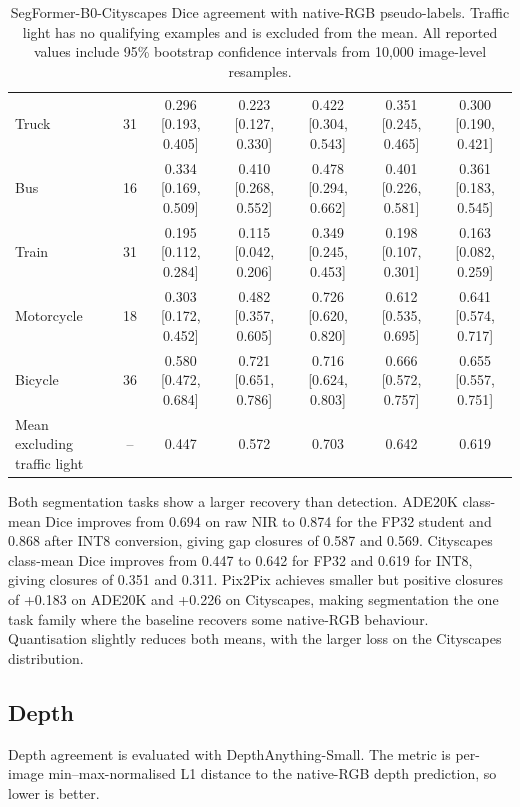 \begin{table}[!htbp]
{\begin{tabular}{lcccccc}
Truck & 31 & 0.296 [0.193, 0.405] & 0.223 [0.127, 0.330] & 0.422 [0.304, 0.543] & 0.351 [0.245, 0.465] & 0.300 [0.190, 0.421] \\
Bus & 16 & 0.334 [0.169, 0.509] & 0.410 [0.268, 0.552] & 0.478 [0.294, 0.662] & 0.401 [0.226, 0.581] & 0.361 [0.183, 0.545] \\
Train & 31 & 0.195 [0.112, 0.284] & 0.115 [0.042, 0.206] & 0.349 [0.245, 0.453] & 0.198 [0.107, 0.301] & 0.163 [0.082, 0.259] \\
Motorcycle & 18 & 0.303 [0.172, 0.452] & 0.482 [0.357, 0.605] & 0.726 [0.620, 0.820] & 0.612 [0.535, 0.695] & 0.641 [0.574, 0.717] \\
Bicycle & 36 & 0.580 [0.472, 0.684] & 0.721 [0.651, 0.786] & 0.716 [0.624, 0.803] & 0.666 [0.572, 0.757] & 0.655 [0.557, 0.751] \\
\hline
Mean excluding traffic light & -- & 0.447 & 0.572 & 0.703 & 0.642 & 0.619 \\
\hline
\end{tabular}
}
\caption{SegFormer-B0-Cityscapes Dice agreement with native-RGB pseudo-labels. Traffic light has no qualifying examples and is excluded from the mean. All reported values include 95\% bootstrap confidence intervals from 10{,}000 image-level resamples.}
\label{tab:res_seg_cityscapes}
\end{table}

Both segmentation tasks show a larger recovery than detection. ADE20K class-mean Dice improves from 0.694 on raw NIR to 0.874 for the FP32 student and 0.868 after INT8 conversion, giving gap closures of 0.587 and 0.569. Cityscapes class-mean Dice improves from 0.447 to 0.642 for FP32 and 0.619 for INT8, giving closures of 0.351 and 0.311. Pix2Pix achieves smaller but positive closures of +0.183 on ADE20K and +0.226 on Cityscapes, making segmentation the one task family where the baseline recovers some native-RGB behaviour. Quantisation slightly reduces both means, with the larger loss on the Cityscapes distribution.

\subsection{Depth}

Depth agreement is evaluated with DepthAnything-Small. The metric is per-image min--max-normalised L1 distance to the native-RGB depth prediction, so lower is better.


